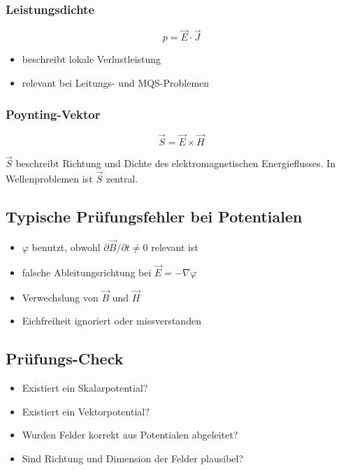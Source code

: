 \documentclass[a4paper]{article}
\newcommand{\E}{\vec E}
\newcommand{\Hf}{\vec H}
\newcommand{\B}{\vec B}
\newcommand{\J}{\vec J}
\begin{document}
\subsubsection{Leistungsdichte}

\[
p = \E \cdot \J
\]

\begin{itemize}
  \item beschreibt lokale Verlustleistung
  \item relevant bei Leitungs- und MQS-Problemen
\end{itemize}

\subsubsection{Poynting-Vektor}

\[
\vec S = \E \times \Hf
\]

\begin{merke}
$\vec S$ beschreibt Richtung und Dichte des elektromagnetischen Energieflusses.
In Wellenproblemen ist $\vec S$ zentral.
\end{merke}

\subsection{Typische Prüfungsfehler bei Potentialen}

\begin{abwandlung}
\begin{itemize}
  \item $\varphi$ benutzt, obwohl $\partial \B/\partial t \neq 0$ relevant ist
  \item falsche Ableitungsrichtung bei $\E=-\nabla\varphi$
  \item Verwechslung von $\B$ und $\Hf$
  \item Eichfreiheit ignoriert oder missverstanden
\end{itemize}
\end{abwandlung}

\subsection{Prüfungs-Check}

\begin{checkitem}
\begin{itemize}
  \item Existiert ein Skalarpotential?
  \item Existiert ein Vektorpotential?
  \item Wurden Felder korrekt aus Potentialen abgeleitet?
  \item Sind Richtung und Dimension der Felder plausibel?
\end{itemize}
\end{checkitem}
\end{document}
